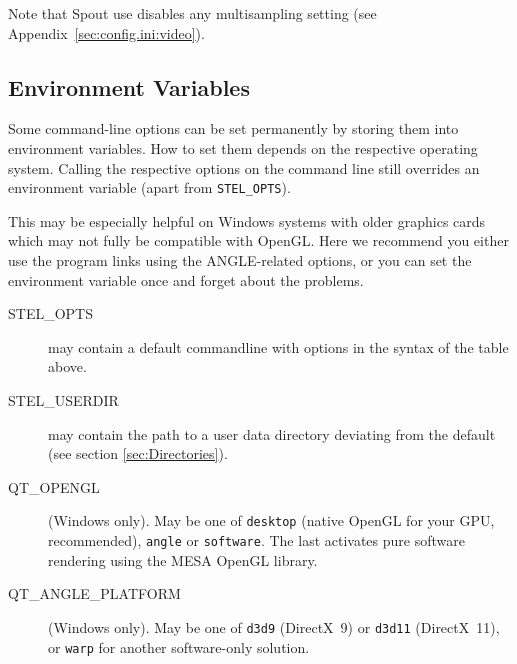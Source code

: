 Note that Spout use disables any multisampling setting (see Appendix~\ref{sec:config.ini:video}). 

\subsection{Environment Variables}
\label{sec:Environment}

Some command-line options can be set permanently by storing them into
environment variables. How to set them depends on the respective
operating system. Calling the respective options on the command line
still overrides an environment variable (apart from
\texttt{STEL\_OPTS}).

This may be especially helpful on Windows systems with older graphics
cards which may not fully be compatible with OpenGL. Here we recommend
you either use the program links using the ANGLE-related options, or
you can set the environment variable once and forget about the
problems.

\begin{description}
\item[STEL\_OPTS] may contain a default commandline with options in the syntax of the table above.
\item[STEL\_USERDIR] may contain the path to a user data directory
  deviating from the default (see section \ref{sec:Directories}).
\item[QT\_OPENGL] (Windows only). May be one of \texttt{desktop} (native OpenGL for your GPU, recommended),
  \texttt{angle} or \texttt{software}. The last activates pure software rendering using the MESA OpenGL library.
\item[QT\_ANGLE\_PLATFORM] (Windows only). May be one of \texttt{d3d9} (DirectX~9) or \texttt{d3d11} (DirectX~11),
  or \texttt{warp} for another software-only solution.
\end{description}



